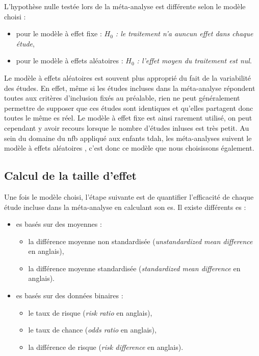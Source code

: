L'hypothèse nulle testée lors de la méta-analyse est différente selon le modèle choisi :
\begin{itemize}
\item pour le modèle à effet fixe : 
\textit{$H_{0}$ : le traitement n'a auncun effet dans chaque étude},
\item pour le modèle à effets aléatoires : 
\textit{$H_{0}$ : l'effet moyen du traitement est nul}.
\end{itemize}

Le modèle à effets aléatoires est souvent plus approprié du fait de la variabilité des études. En effet, même si les études incluses dans la méta-analyse 
répondent toutes aux critères d'inclusion fixés au préalable, rien ne peut généralement permettre de supposer que ces études sont identiques et qu'elles 
partagent donc toutes le même \gls{es} réel. Le modèle à effet fixe est ainsi rarement utilisé, on peut cependant y avoir recours lorsque le nombre d'études inluses 
est très petit. Au sein du domaine du \gls{nfb} appliqué aux enfants \gls{tdah}, les méta-analyses suivent le modèle à effets aléatoires 
\citep{Cortese2016, Micoulaud2014}, c'est donc ce modèle que nous choisissons également.

\subsection{Calcul de la taille d'effet}

Une fois le modèle choisi, l'étape suivante est de quantifier l'efficacité de chaque étude incluse dans la méta-analyse en calculant son \gls{es}. 
Il existe différents \gls{es} \citep{Borenstein2009} :
\renewcommand{\labelitemi}{$\bullet$}
\renewcommand{\labelitemii}{$\cdot$}
\begin{itemize}
\item \gls{es} basés sur des moyennes :
\begin{itemize}
    \item la différence moyenne non standardisée (\textit{unstandardized mean difference} en anglais),
    \item la différence moyenne standardisée (\textit{standardized mean difference} en anglais).
\end{itemize}
\item \gls{es} basés sur des données binaires :
\begin{itemize}
    \item le taux de risque (\textit{risk ratio} en anglais),
    \item le taux de chance (\textit{odds ratio} en anglais),
		\item la différence de risque (\textit{risk difference} en anglais).
\end{itemize}
\end{itemize}


